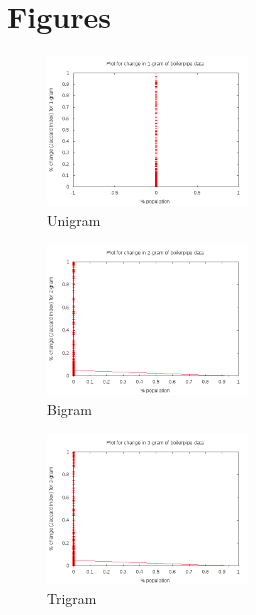 \documentclass{article}
\begin{document}

\newpage

\clearpage

\section{Figures}

\begin{center}
\begin{figure}[ht]
    \centering
    \includegraphics[width=0.475\textwidth,natwidth=700,natheight=700]{one_gram.png}
    \caption{Unigram}
    \label{fig:one_gram.png}
\end{figure}
\end{center}

\begin{center}
\begin{figure}[ht]
    \centering
    \includegraphics[width=0.475\textwidth,natwidth=700,natheight=700]{two_gram.png}
    \caption{Bigram}
    \label{fig:two_gram.png}
\end{figure}
\end{center}

\begin{center}
\begin{figure}[ht]
    \centering
    \includegraphics[width=0.475\textwidth,natwidth=700,natheight=700]{three_gram.png}
    \caption{Trigram}
    \label{fig:three_gram.png}
\end{figure}
\end{center}
\end{document}

